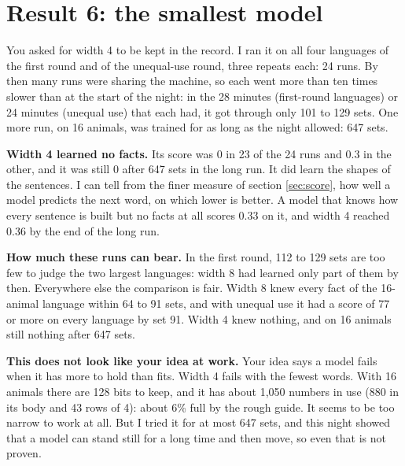 \section{Result 6: the smallest model}\label{sec:four}

You asked for width 4 to be kept in the record. I ran it on all four languages of the first
round and of the unequal-use round, three repeats each: 24 runs. By then many runs were sharing
the machine, so each went more than ten times slower than at the start of the night: in the 28
minutes (first-round languages) or 24 minutes (unequal use) that each had, it got through only
101 to 129 sets. One more run, on 16 animals, was trained for as long as the night allowed:
647 sets.

\textbf{Width 4 learned no facts.} Its score was 0 in 23 of the 24 runs and 0.3 in the other,
and it was still 0 after 647 sets in the long run. It did learn the shapes of the sentences. I
can tell from the finer measure of section \ref{sec:score}, how well a model predicts the next
word, on which lower is better. A model that knows how every sentence is built but no facts at
all scores 0.33 on it, and width 4 reached 0.36 by the end of the long run.

\textbf{How much these runs can bear.} In the first round, 112 to 129 sets are too few to
judge the two largest languages: width 8 had learned only part of them by then. Everywhere
else the comparison is fair. Width 8 knew every fact of the 16-animal language within 64 to
91 sets, and with unequal use it had a score of 77 or more on every language by set 91. Width 4 knew
nothing, and on 16 animals still nothing after 647 sets.

\textbf{This does not look like your idea at work.} Your idea says a model fails when it has
more to hold than fits. Width 4 fails with the fewest words. With 16 animals there are 128
bits to keep, and it has about 1,050 numbers in use (880 in its body and 43 rows of 4): about
6\% full by the rough guide. It seems to be too narrow to work at all. But I tried it for at
most 647 sets, and this night showed that a model can stand still for a long time and then
move, so even that is not proven.
